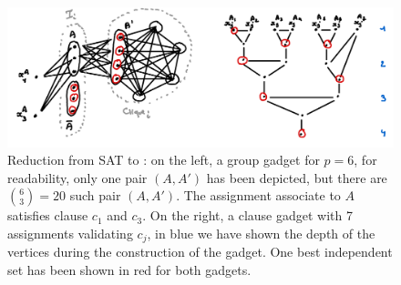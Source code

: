\begin{figure}
    \includegraphics[width=\textwidth]{figures/indset-td-gadgets.png}
    \caption{Reduction from SAT to : on the left, a group gadget for $p = 6$, for readability, only one pair $(A, A')$ has been depicted, but there are $\binom{6}{3} = 20$ such pair $(A, A')$. The assignment associate to $A$ satisfies clause $c_1$ and $c_3$. On the right, a clause gadget with 7 assignments validating $c_j$, in blue we have shown the depth of the vertices during the construction of the gadget. One best independent set has been shown in red for both gadgets.}
    \label{fig:indset-td-gadgets}
\end{figure}